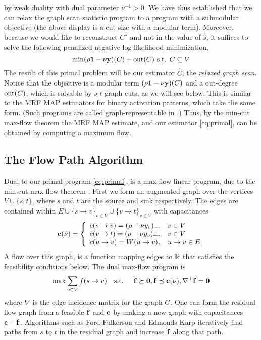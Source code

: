by weak duality with dual parameter $\nu^{-1} > 0$.
We have thus established that we can relax the graph scan statistic program to a program with a submodular objective (the above display is a cut size with a modular term).
Moreover, because we would like to reconstruct $C^\star$ and not in the value of $\hat s$, it suffices to solve the following penalized negative log-likelihood minimization,
\begin{equation}
\label{eq:primal}
\min (\rho \one - \nu \yb) (C) + \out(C) \textrm{ s.t. } C \subseteq V 
\end{equation}
The result of this primal problem will be our estimator $\hat C$, the {\em relaxed graph scan}.
Notice that the objective is a modular term $(\rho {\bf 1} - \nu \mathbf{y}) (C)$ and a out-degree $\textrm{out}(C)$, which is solvable by $s$-$t$ graph cuts, as we will see below.
This is similar to the MRF MAP estimators for binary activation patterns, which take the same form. (Such programs are called graph-representable in \cite{kolmogorov2004energy}.)
Thus, by the min-cut max-flow theorem the MRF MAP estimate, and our estimator \eqref{eq:primal}, can be obtained by computing a maximum flow.

\subsection{The Flow Path Algorithm}

Dual to our primal program \eqref{eq:primal}, is a max-flow linear program, due to the min-cut max-flow theorem \cite{cormen2001introduction}.
First we form an augmented graph over the vertices $V \cup \{s,t\}$, where $s$ and $t$ are the source and sink respectively.
The edges are contained within $E \cup \{ s\to v \}_{v \in V} \cup \{ v \to t \}_{v \in V}$ with capacitances
\[
\mathbf{c}(\nu) = \left\{
\begin{array}{ll}
c(s \to v) = (\rho - \nu y_v)_- , &v \in V\\
c(v \to t) = (\rho - \nu y_v)_+ , &v \in V\\
c(u \to v) = W(u \to v), &u \to v \in E
\end{array}
\right.
\]
A flow over this graph, is a function mapping edges to $\mathbb{R}$ that satisfies the feasibility conditions below. 
The dual max-flow program is 
\begin{equation}
\label{eq:maxflow}
\max \sum_{v \in V} f(s \to v) \textrm{\quad s.t. \quad} \fb \succeq \zero, \fb \preceq \cbb(\nu), \nabla^\top \fb = \zero
\end{equation}
where $\nabla$ is the edge incidence matrix for the graph $G$.
One can form the residual flow graph from a feasible $\mathbf{f}$ and $\mathbf{c}$ by making a new graph with capacitances $\mathbf{c} - \mathbf{f}$.
Algorithms such as Ford-Fulkerson and Edmonds-Karp iteratively find paths from $s$ to $t$ in the residual graph and increase $\mathbf{f}$ along that path.


